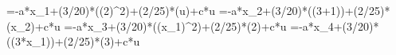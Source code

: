 =-a*x_1+(3/20)*\sin((2)^2)+(2/25)*\cos(u)+c*u
=-a*x_2+(3/20)*\sin((3+1))+(2/25)*\cos(x_2)+c*u
=-a*x_3+(3/20)*\sin((x_1)^2)+(2/25)*\cos(2)+c*u
=-a*x_4+(3/20)*\sin((3*x_1))+(2/25)*\cos(3)+c*u
